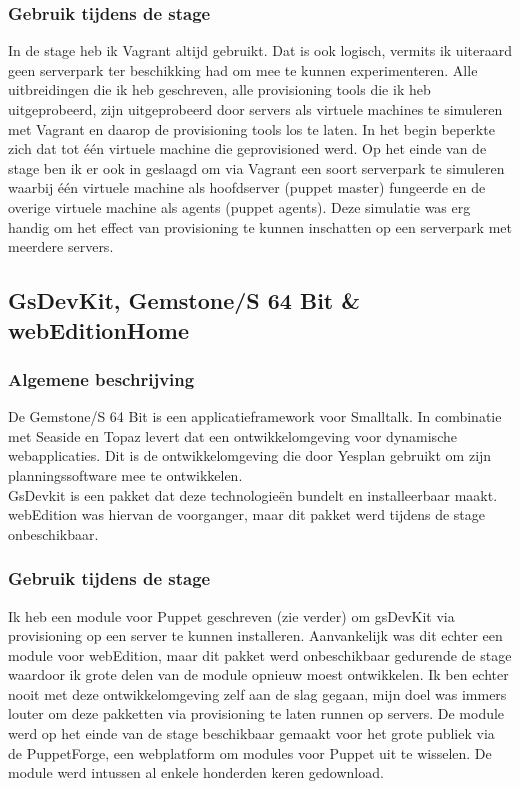 \documentclass[a4paper,11pt]{article}
\theoremstyle{definition}
\begin{document}
\subsubsection{Gebruik tijdens de stage}
\noindent In de stage heb ik Vagrant altijd gebruikt. Dat is ook logisch, vermits ik uiteraard geen serverpark ter beschikking had om mee te kunnen experimenteren. Alle uitbreidingen die ik 
heb geschreven, alle provisioning tools die ik heb uitgeprobeerd, zijn 
uitgeprobeerd door servers als virtuele machines te simuleren met Vagrant en daarop de 
provisioning tools los te laten. In het begin beperkte zich dat tot één virtuele machine die geprovisioned werd. Op het einde van de stage ben ik er ook 
in geslaagd om via Vagrant een soort serverpark te simuleren waarbij één 
virtuele machine als hoofdserver (puppet master) fungeerde en de overige 
virtuele machine als agents (puppet agents). Deze simulatie was erg handig om 
het effect van provisioning te kunnen inschatten op een serverpark met meerdere 
servers.

\subsection{GsDevKit, Gemstone/S 64 Bit \& webEditionHome}
\subsubsection{Algemene beschrijving}
De Gemstone/S 64 Bit is een applicatieframework voor Smalltalk. In combinatie met 
Seaside en Topaz levert dat een ontwikkelomgeving voor dynamische 
webapplicaties. Dit is de ontwikkelomgeving die door Yesplan gebruikt om zijn planningssoftware mee te ontwikkelen.\\

\noindent GsDevkit is een pakket dat deze technologieën bundelt en installeerbaar maakt. 
webEdition was hiervan de voorganger, maar dit pakket werd tijdens de stage onbeschikbaar.
\subsubsection{Gebruik tijdens de stage}
Ik heb een module voor Puppet geschreven (zie verder) om gsDevKit via provisioning op een server te 
kunnen installeren. Aanvankelijk was dit echter een module voor webEdition, maar 
dit pakket werd onbeschikbaar gedurende de stage waardoor ik grote delen van de module opnieuw
moest ontwikkelen. Ik ben echter nooit met deze ontwikkelomgeving zelf aan de slag 
gegaan, mijn doel was immers louter om deze pakketten via provisioning te laten runnen op 
servers. De module werd op het einde van de stage beschikbaar gemaakt voor het 
grote publiek via de PuppetForge, een webplatform om modules voor Puppet uit te wisselen. De 
module werd intussen al enkele honderden keren gedownload.
\end{document}
